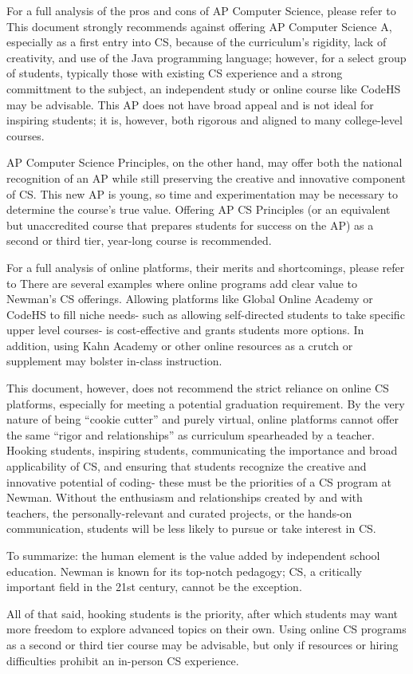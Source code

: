 For a full analysis of the pros and cons of AP Computer Science, please refer to %
This document strongly recommends against offering AP Computer Science A, especially as a first entry into CS, because of the curriculum's rigidity, lack of creativity, and use of the Java programming language; however, for a select group of students, typically those with existing CS experience and a strong committment to the subject, an independent study or online course like CodeHS may be advisable. This AP does not have broad appeal and is not ideal for inspiring students; it is, however, both rigorous and aligned to many college-level courses. \par
AP Computer Science Principles, on the other hand, may offer both the national recognition of an AP while still preserving the creative and innovative component of CS. This new AP is young, so time and experimentation may be necessary to determine the course's true value. Offering AP CS Principles (or an equivalent but unaccredited course that prepares students for success on the AP) as a second or third tier, year-long course is recommended.\par


For a full analysis of online platforms, their merits and shortcomings, please refer to %
There are several examples where online programs add clear value to Newman's CS offerings. Allowing platforms like Global Online Academy or CodeHS to fill niche needs- such as allowing self-directed students to take specific upper level courses- is cost-effective and grants students more options. In addition, using Kahn Academy or other online resources as a crutch or supplement may bolster in-class instruction.\par
This document, however, does not recommend the strict reliance on online CS platforms, especially for meeting a potential graduation requirement. By the very nature of being ``cookie cutter'' and purely virtual, online platforms cannot offer the same ``rigor and relationships'' as curriculum spearheaded by a teacher. Hooking students, inspiring students, communicating the importance and broad applicability of CS, and ensuring that students recognize the creative and innovative potential of coding- these must be the priorities of a CS program at Newman. Without the enthusiasm and relationships created by and with teachers, the personally-relevant and curated projects, or the hands-on communication, students will be less likely to pursue or take interest in CS.\par 
To summarize: the human element is the value added by independent school education. Newman is known for its top-notch pedagogy; CS, a critically important field in the 21st century, cannot be the exception. \par
All of that said, hooking students is the priority, after which students may want more freedom to explore advanced topics on their own. Using online CS programs as a second or third tier course may be advisable, but only if resources or hiring difficulties prohibit an in-person CS experience. \par   

